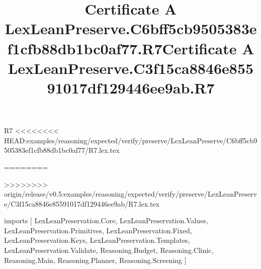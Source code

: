 \begin{lexlean}{R7}
<<<<<<<< HEAD:examples/reasoning/expected/verify/preserve/LexLeanPreserve/C6bff5cb9505383ef1cfb88db1bc0af77/R7.lex.tex
\title{Certificate A LexLeanPreserve.C6bff5cb9505383ef1cfb88db1bc0af77.R7}
========
\title{Certificate A LexLeanPreserve.C3f15ca8846e85591017df129446ee9ab.R7}
>>>>>>>> origin/release/v0.5:examples/reasoning/expected/verify/preserve/LexLeanPreserve/C3f15ca8846e85591017df129446ee9ab/R7.lex.tex
\begin{coremodule}
imports [
  LexLeanPreservation.Core,
  LexLeanPreservation.Values,
  LexLeanPreservation.Primitives,
  LexLeanPreservation.Fixed,
  LexLeanPreservation.Keys,
  LexLeanPreservation.Templates,
  LexLeanPreservation.Validate,
  Reasoning.Budget,
  Reasoning.Clinic,
  Reasoning.Main,
  Reasoning.Planner,
  Reasoning.Screening
]


\end{coremodule}
\end{lexlean}
